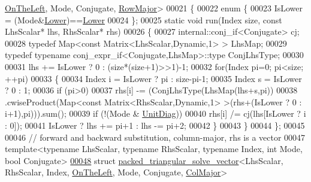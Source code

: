 \begin{DoxyCode}
      \hyperlink{group__enums_ggac22de43beeac7a78b384f99bed5cee0ba129609b3bdf23b071f5f86cf2f995ec4}{OnTheLeft}, Mode, Conjugate, \hyperlink{group__enums_ggaacded1a18ae58b0f554751f6cdf9eb13acfcde9cd8677c5f7caf6bd603666aae3}{RowMajor}>
00021 \{
00022   \textcolor{keyword}{enum} \{
00023     IsLower = (Mode&\hyperlink{group__enums_gga39e3366ff5554d731e7dc8bb642f83cda891792b8ed394f7607ab16dd716f60e6}{Lower})==\hyperlink{group__enums_gga39e3366ff5554d731e7dc8bb642f83cda891792b8ed394f7607ab16dd716f60e6}{Lower}
00024   \};
00025   \textcolor{keyword}{static} \textcolor{keywordtype}{void} run(Index size, \textcolor{keyword}{const} LhsScalar* lhs, RhsScalar* rhs)
00026   \{
00027     internal::conj\_if<Conjugate> cj;
00028     \textcolor{keyword}{typedef} Map<const Matrix<LhsScalar,Dynamic,1> > LhsMap;
00029     \textcolor{keyword}{typedef} \textcolor{keyword}{typename} conj\_expr\_if<Conjugate,LhsMap>::type ConjLhsType;
00030 
00031     lhs += IsLower ? 0 : (size*(size+1)>>1)-1;
00032     \textcolor{keywordflow}{for}(Index pi=0; pi<size; ++pi)
00033     \{
00034       Index i = IsLower ? pi : size-pi-1;
00035       Index s = IsLower ? 0 : 1;
00036       \textcolor{keywordflow}{if} (pi>0)
00037     rhs[i] -= (ConjLhsType(LhsMap(lhs+s,pi))
00038         .cwiseProduct(Map<\textcolor{keyword}{const} Matrix<RhsScalar,Dynamic,1> >(rhs+(IsLower ? 0 : i+1),pi))).sum();
00039       \textcolor{keywordflow}{if} (!(Mode & \hyperlink{group__enums_gga39e3366ff5554d731e7dc8bb642f83cdaddb72f888ac85d5a1c52333e54f9374b}{UnitDiag}))
00040     rhs[i] /= cj(lhs[IsLower ? i : 0]);
00041       IsLower ? lhs += pi+1 : lhs -= pi+2;
00042     \}
00043   \}
00044 \};
00045 
00046 \textcolor{comment}{// forward and backward substitution, column-major, rhs is a vector}
00047 \textcolor{keyword}{template}<\textcolor{keyword}{typename} LhsScalar, \textcolor{keyword}{typename} RhsScalar, \textcolor{keyword}{typename} Index, \textcolor{keywordtype}{int} Mode, \textcolor{keywordtype}{bool} Conjugate>
\hyperlink{structinternal_1_1packed__triangular__solve__vector_3_01_lhs_scalar_00_01_rhs_scalar_00_01_index28b9bd679eec74694b1e600413bff835}{00048} \textcolor{keyword}{struct }\hyperlink{structinternal_1_1packed__triangular__solve__vector}{packed\_triangular\_solve\_vector}<LhsScalar, RhsScalar, Index, 
      \hyperlink{group__enums_ggac22de43beeac7a78b384f99bed5cee0ba129609b3bdf23b071f5f86cf2f995ec4}{OnTheLeft}, Mode, Conjugate, \hyperlink{group__enums_ggaacded1a18ae58b0f554751f6cdf9eb13a0cbd4bdd0abcfc0224c5fcb5e4f6669a}{ColMajor}>

\end{DoxyCode}

